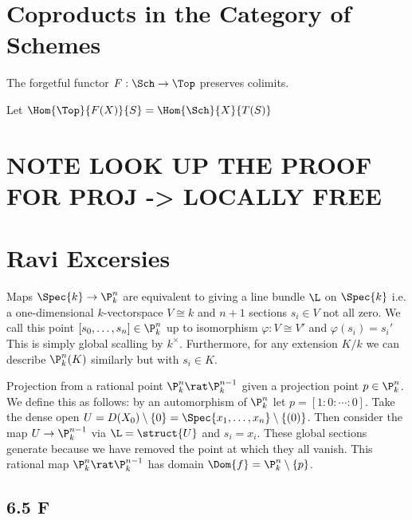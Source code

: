 \documentclass[12pt]{article}
\begin{document}
\section{Coproducts in the Category of Schemes}

\begin{prop}
The forgetful functor $F : \Sch \to \Top$ preserves colimits. 
\end{prop}

\begin{rmk}
Let $\Hom{\Top}{F(X)}{S} = \Hom{\Sch}{X}{T(S)}$ 
\end{rmk}

\section{NOTE LOOK UP THE PROOF FOR PROJ -> LOCALLY FREE}

\section{Ravi Excersies}

\begin{rmk}
Maps $\Spec{k} \to \P^n_k$ are equivalent to giving a line bundle $\L$ on $\Spec{k}$ i.e. a one-dimensional $k$-vectorspace $V \cong k$ and $n+1$ sections $s_i \in V$ not all zero. We call this point $[s_0, \dots, s_n] \in \P^n_k$ up to isomorphism $\varphi : V \cong V'$ and $\varphi(s_i) = s_i'$ This is simply global scalling by $k^\times$. Furthermore, for any extension $K / k$ we can describe $\P^n_k(K)$ similarly but with $s_i \in K$. 
\end{rmk}

\begin{definition}
Projection from a rational point $\P^n_k \rat \P^{n-1}_k$ given a projection point $p \in \P^n_k$. We define this as follows: by an automorphism of $\P^n_k$ let $p = [1 : 0 : \cdots : 0]$. Take the dense open $U = D(X_0) \setminus \{ 0 \} = \Spec{x_1, \dots, x_n} \setminus \{ (0) \}$. Then consider the map $U \to \P^{n-1}_k$ via $\L = \struct{U}$ and $s_i = x_i$. These global sections generate because we have removed the point at which they all vanish. This rational map $\P^n_k \rat \P^{n-1}_k$ has domain $\Dom{f} = \P^n_k \setminus \{ p \}$.   
\end{definition}


\subsection{6.5 F}
\end{document}
